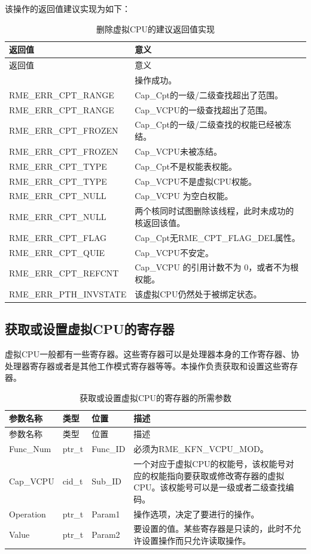 该操作的返回值建议实现为如下：

\begin{xltabular}{\textwidth}{@{}>{\hsize\raggedright\arraybackslash}X>{\hsize\raggedright\arraybackslash}X@{}}
\caption{删除虚拟CPU的建议返回值实现}\label{tab:8-88-delete-virtual-cpu-suggested-return-values}\\
\toprule
返回值 & 意义\tabularnewline
\endfirsthead
\toprule
返回值 & 意义\tabularnewline
\midrule
\endhead
\bottomrule
{} & 操作成功。\tabularnewline
    RME\_ERR\_CPT\_RANGE & Cap\_Cpt的一级/二级查找超出了范围。\tabularnewline
    RME\_ERR\_CPT\_RANGE & Cap\_VCPU的一级查找超出了范围。\tabularnewline
    RME\_ERR\_CPT\_FROZEN & Cap\_Cpt的一级/二级查找的权能已经被冻结。\tabularnewline
    RME\_ERR\_CPT\_FROZEN & Cap\_VCPU未被冻结。\tabularnewline
    RME\_ERR\_CPT\_TYPE & Cap\_Cpt不是权能表权能。\tabularnewline
    RME\_ERR\_CPT\_TYPE & Cap\_VCPU不是虚拟CPU权能。\tabularnewline
    RME\_ERR\_CPT\_NULL & Cap\_VCPU 为空白权能。\tabularnewline
    RME\_ERR\_CPT\_NULL & 两个核同时试图删除该线程，此时未成功的核返回该值。\tabularnewline
    RME\_ERR\_CPT\_FLAG & Cap\_Cpt无RME\_CPT\_FLAG\_DEL属性。\tabularnewline
    RME\_ERR\_CPT\_QUIE & Cap\_VCPU不安定。\tabularnewline
    RME\_ERR\_CPT\_REFCNT & Cap\_VCPU 的引用计数不为 0，或者不为根权能。\tabularnewline
    RME\_ERR\_PTH\_INVSTATE & 该虚拟CPU仍然处于被绑定状态。\tabularnewline
\end{xltabular}

\subsection{获取或设置虚拟CPU的寄存器}\label{subsec:8-get-or-set-virtual-cpu-registers}

虚拟CPU一般都有一些寄存器。这些寄存器可以是处理器本身的工作寄存器、协处理器寄存器或者是其他工作模式寄存器等等。本操作负责获取和设置这些寄存器。

\begin{xltabular}{\textwidth}{@{}>{\hsize\raggedright\arraybackslash}X>{\hsize\raggedright\arraybackslash}X>{\hsize\raggedright\arraybackslash}X>{\hsize\raggedright\arraybackslash}X@{}}
\caption{获取或设置虚拟CPU的寄存器的所需参数}\label{tab:8-89-get-or-set-virtual-cpu-registers-parameters}\\
\toprule
参数名称 & 类型 & 位置 & 描述\tabularnewline
\endfirsthead
\toprule
参数名称 & 类型 & 位置 & 描述\tabularnewline
\midrule
\endhead
\bottomrule
\endlastfoot
Func\_Num & ptr\_t & Func\_ID &
必须为RME\_KFN\_VCPU\_MOD。\tabularnewline
Cap\_VCPU & cid\_t & Sub\_ID &
一个对应于虚拟CPU的权能号，该权能号对应的权能指向要获取或修改寄存器的虚拟CPU。该权能号可以是一级或者二级查找编码。\tabularnewline
Operation & ptr\_t & Param1 &
操作选项，决定了要进行的操作。\tabularnewline
Value & ptr\_t & Param2 &
要设置的值。某些寄存器是只读的，此时不允许设置操作而只允许读取操作。\tabularnewline
\end{xltabular}

